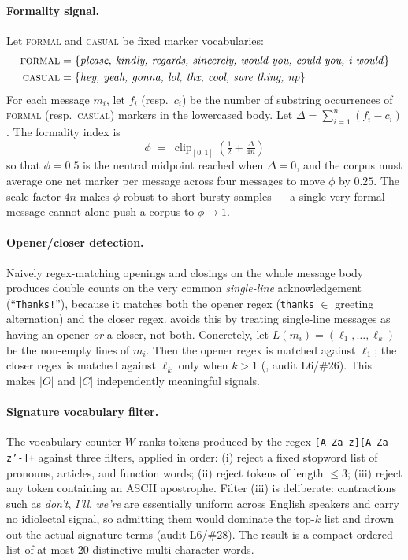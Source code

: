 \paragraph{Formality signal.}
Let \textsc{formal} and \textsc{casual} be fixed marker vocabularies:
\begin{align*}
  \textsc{formal} &= \{\text{\emph{please, kindly, regards, sincerely, would you, could you, i would}}\} \\
  \textsc{casual} &= \{\text{\emph{hey, yeah, gonna, lol, thx, cool, sure thing, np}}\}
\end{align*}
For each message $m_i$, let $f_i$ (resp.\ $c_i$) be the number of
substring occurrences of \textsc{formal} (resp.\ \textsc{casual})
markers in the lowercased body. Let
$\Delta = \sum_{i=1}^{n} (f_i - c_i)$. The formality index is
\begin{equation}
  \phi \;=\; \operatorname{clip}_{[0,1]}\!\left(\tfrac{1}{2} + \tfrac{\Delta}{4n}\right)
  \label{eq:formality}
\end{equation}
so that $\phi = 0.5$ is the neutral midpoint reached when
$\Delta = 0$, and the corpus must average one net marker per message
across four messages to move $\phi$ by $0.25$. The scale factor $4n$
makes $\phi$ robust to short bursty samples --- a single very formal
message cannot alone push a corpus to $\phi \to 1$.

\paragraph{Opener/closer detection.}
Naively regex-matching openings and closings on the whole message body
produces double counts on the very common \emph{single-line}
acknowledgement (``\texttt{Thanks!}''), because it matches both the
opener regex (\texttt{thanks} $\in$ greeting alternation) and the closer
regex. \coviber{} avoids this by treating single-line messages as
having an opener \emph{or} a closer, not both. Concretely, let
$L(m_i) = (\ell_1, \ldots, \ell_k)$ be the non-empty lines of $m_i$.
Then the opener regex is matched against $\ell_1$; the closer regex is
matched against $\ell_k$ only when $k > 1$
(, audit L6/\#26). This makes $|O|$ and $|C|$
independently meaningful signals.

\paragraph{Signature vocabulary filter.}
The vocabulary counter $W$ ranks tokens produced by the regex
\texttt{[A-Za-z][A-Za-z'-]+} against three filters, applied in order:
(i) reject a fixed stopword list of pronouns, articles, and function
words; (ii) reject tokens of length $\leq 3$; (iii) reject any token
containing an ASCII apostrophe. Filter (iii) is deliberate: contractions
such as \emph{don't}, \emph{I'll}, \emph{we're} are essentially uniform
across English speakers and carry no idiolectal signal, so admitting
them would dominate the top-$k$ list and drown out the actual signature
terms (audit L6/\#28). The result is a compact ordered list of at most
20 distinctive multi-character words.

